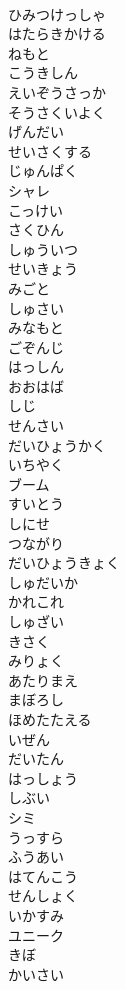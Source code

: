 \documentclass[8pt]{extreport}
\begin{document}
\begin{CJK}{UTF8}{min}
\\	ひみつけっしゃ
\\	はたらきかける
\\	ねもと
\\	こうきしん
\\	えいぞうさっか
\\	そうさくいよく
\\	げんだい
\\	せいさくする
\\	じゅんぱく
\\	シャレ
\\	こっけい
\\	さくひん
\\	しゅういつ
\\	せいきょう
\\	みごと
\\	しゅさい
\\	みなもと
\\	ごぞんじ
\\	はっしん
\\	おおはば
\\	しじ
\\	せんさい
\\	だいひょうかく
\\	いちやく
\\	ブーム
\\	すいとう
\\	しにせ
\\	つながり
\\	だいひょうきょく
\\	しゅだいか
\\	かれこれ
\\	しゅざい
\\	きさく
\\	みりょく
\\	あたりまえ
\\	まぼろし
\\	ほめたたえる
\\	いぜん
\\	だいたん
\\	はっしょう
\\	しぶい
\\	シミ
\\	うっすら
\\	ふうあい
\\	はてんこう
\\	せんしょく
\\	いかすみ
\\	ユニーク
\\	きぼ
\\	かいさい

\end{CJK}
\end{document}
